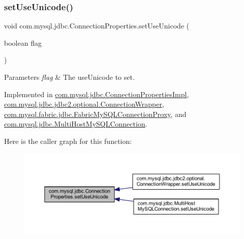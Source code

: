 \subsubsection{\texorpdfstring{set\+Use\+Unicode()}{setUseUnicode()}}
{\footnotesize\ttfamily void com.\+mysql.\+jdbc.\+Connection\+Properties.\+set\+Use\+Unicode (\begin{DoxyParamCaption}\item[{boolean}]{flag }\end{DoxyParamCaption})}


\begin{DoxyParams}{Parameters}
{\em flag} & The use\+Unicode to set. \\
\hline
\end{DoxyParams}


Implemented in \mbox{\hyperlink{classcom_1_1mysql_1_1jdbc_1_1_connection_properties_impl_a67fda6c70d561a763aa0dd961a5b4dc1}{com.\+mysql.\+jdbc.\+Connection\+Properties\+Impl}}, \mbox{\hyperlink{classcom_1_1mysql_1_1jdbc_1_1jdbc2_1_1optional_1_1_connection_wrapper_aad47efde1fa5f5f876ed766cf6b01a43}{com.\+mysql.\+jdbc.\+jdbc2.\+optional.\+Connection\+Wrapper}}, \mbox{\hyperlink{classcom_1_1mysql_1_1fabric_1_1jdbc_1_1_fabric_my_s_q_l_connection_proxy_a56fe8ba6eb8a82c09f7187772bc78782}{com.\+mysql.\+fabric.\+jdbc.\+Fabric\+My\+S\+Q\+L\+Connection\+Proxy}}, and \mbox{\hyperlink{classcom_1_1mysql_1_1jdbc_1_1_multi_host_my_s_q_l_connection_afcdd021cd65ac9c824bf069c3d52a22b}{com.\+mysql.\+jdbc.\+Multi\+Host\+My\+S\+Q\+L\+Connection}}.

Here is the caller graph for this function\+:\nopagebreak
\begin{figure}[H]
\begin{center}
\leavevmode
\includegraphics[width=350pt]{interfacecom_1_1mysql_1_1jdbc_1_1_connection_properties_a2b78e87d6cfd73e15066b8bdbc0cecb0_icgraph}
\end{center}
\end{figure}
\mbox{\label{interfacecom_1_1mysql_1_1jdbc_1_1_connection_properties_a8c6cb2052bdd1e63d3be6d2fcbd3908c}} 
